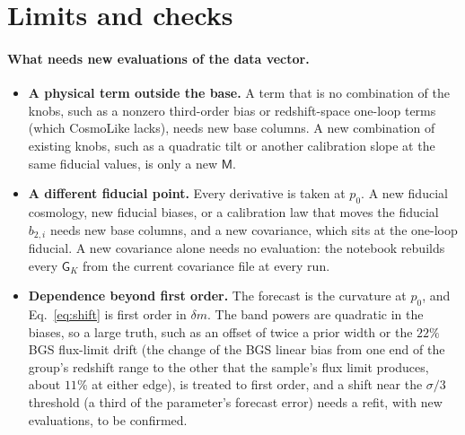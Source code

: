 \documentclass[11pt]{article}
\newcommand{\mM}{\mathsf{M}}
\newcommand{\mG}{\mathsf{G}}
\begin{document}
\section{Limits and checks}
\label{sec:limits}

\paragraph{What needs new evaluations of the data vector.}
\begin{itemize}
  \item \textbf{A physical term outside the base.}  A term that is no
    combination of the knobs, such as a nonzero third-order bias or
    redshift-space one-loop terms (which CosmoLike lacks), needs new
    base columns.  A new combination of existing knobs, such as a
    quadratic tilt or another calibration slope at the same fiducial
    values, is only a new $\mM$.
  \item \textbf{A different fiducial point.}  Every derivative is taken
    at $p_0$.  A new fiducial cosmology, new fiducial biases, or a
    calibration law that moves the fiducial $b_{2,i}$ needs new base
    columns, and a new covariance, which sits at the one-loop fiducial.
    A new covariance alone needs no evaluation: the notebook rebuilds
    every $\mG_K$ from the current covariance file at every run.
  \item \textbf{Dependence beyond first order.}  The forecast is the
    curvature at $p_0$, and Eq.~\eqref{eq:shift} is first order in
    $\delta m$.  The band powers are quadratic in the biases, so a large
    truth, such as an offset of twice a prior width or the $22\%$ BGS
    flux-limit drift (the change of the BGS linear bias from one end of
    the group's redshift range to the other that the sample's flux limit
    produces, about $11\%$ at either edge), is
    treated to first order, and a shift near the
    $\sigma/3$ threshold (a third of the parameter's forecast error)
    needs a refit, with new evaluations, to be
    confirmed.
\end{itemize}
\end{document}
